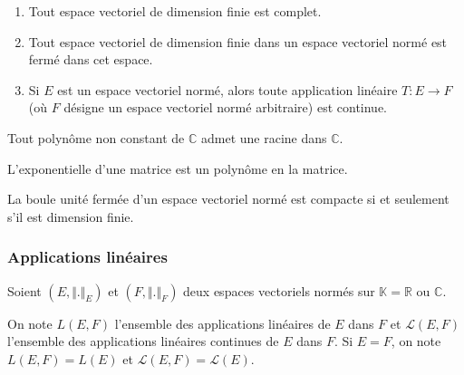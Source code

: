   \begin{corollary}
    \begin{enumerate}[label=(\roman*)]
      \item Tout espace vectoriel de dimension finie est complet.
      \item Tout espace vectoriel de dimension finie dans un espace vectoriel normé est fermé dans cet espace.
      \item Si $E$ est un espace vectoriel normé, alors toute application linéaire $T : E \rightarrow F$ (où $F$ désigne un espace vectoriel normé arbitraire) est continue.
    \end{enumerate}
  \end{corollary}


  \begin{application}
    Tout polynôme non constant de $\mathbb{C}$ admet une racine dans $\mathbb{C}$.
  \end{application}


  \begin{application}
    L'exponentielle d'une matrice est un polynôme en la matrice.
  \end{application}


  \begin{theorem}[Riesz]
    La boule unité fermée d'un espace vectoriel normé est compacte si et seulement s'il est dimension finie.
  \end{theorem}

  \subsubsection{Applications linéaires}


  Soient $(E, \Vert . \Vert_E)$ et $(F, \Vert . \Vert_F)$ deux espaces vectoriels normés sur $\mathbb{K} = \mathbb{R}$ ou $\mathbb{C}$.

  \begin{notation}
    On note $L(E,F)$ l'ensemble des applications linéaires de $E$ dans $F$ et $\mathcal{L}(E,F)$ l'ensemble des applications linéaires continues de $E$ dans $F$. Si $E = F$, on note $L(E,F) = L(E)$ et $\mathcal{L}(E,F) = \mathcal{L}(E)$.
  \end{notation}

